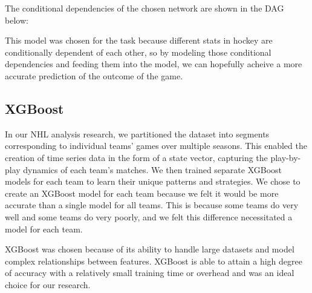 \documentclass[11pt]{article}
\begin{document}
The conditional dependencies of the chosen network are shown in the DAG below:

\begin{center}
\end{center}

This model was chosen for the task because different stats in hockey are conditionally dependent of each other, so by modeling those conditional
dependencies and feeding them into the model, we can hopefully acheive a more accurate prediction of the outcome of the game.

\subsection{XGBoost}

In our NHL analysis research, we partitioned the dataset into segments 
corresponding to individual teams' games over multiple seasons. 
This enabled the creation of time series data in the form of a state vector, capturing the 
play-by-play dynamics of each team's matches. We then trained 
separate XGBoost models for each team to learn their unique patterns 
and strategies. We chose to create an XGBoost model for each team
because we felt it would be more accurate than a single model for all teams.
This is because some teams do very well and some teams do very poorly, and
we felt this difference necessitated a model for each team.

XGBoost was chosen because of its ability to handle large datasets and model complex relationships between features. 
XGBoost is able to attain a high degree of accuracy with a relatively small training time or overhead and was an ideal choice for our research.
\end{document}
